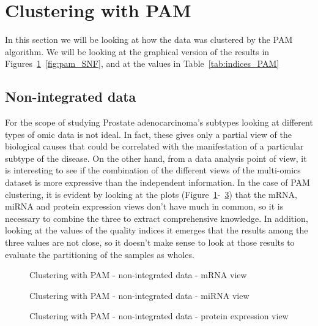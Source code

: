 \section{Clustering with PAM}\label{results_pam}
In this section we will be looking at how the data was clustered by the PAM algorithm. We will be looking at the graphical version of the results in Figures~\ref{fig:pam_1}~\ref{fig:pam_SNF}, and at the values in Table~\ref{tab:indices_PAM}
\subsection{Non-integrated data}\label{pam_nonIntegrated}
For the scope of studying Prostate adenocarcinoma's subtypes looking at different types of omic data is not ideal. In fact, these gives only a partial view of the biological causes that could be correlated with the manifestation of a particular subtype of the disease. On the other hand, from a data analysis point of view, it is interesting to see if the combination of the different views of the multi-omics dataset is more expressive than the independent information. In the case of PAM clustering, it is evident by looking at the plots (Figure~\ref{fig:pam_1}-~\ref{fig:pam_3}) that the mRNA, miRNA and protein expression views don't have much in common, so it is necessary to combine the three to extract comprehensive knowledge. In addition, looking at the values of the quality indices it emerges that the results among the three values are not close, so it doesn't make sense to look at those results to evaluate the partitioning of the samples as wholes.
\begin{figure}[!]\label{fig:pam_1}
    \centering
    \caption{Clustering with PAM - non-integrated data - mRNA view}
\end{figure}
\begin{figure}[!]\label{fig:pam_2}
    \centering
    \caption{Clustering with PAM - non-integrated data - miRNA view}
\end{figure}
\begin{figure}[!]\label{fig:pam_3}
    \centering
    \caption{Clustering with PAM - non-integrated data - protein expression view}
\end{figure}

